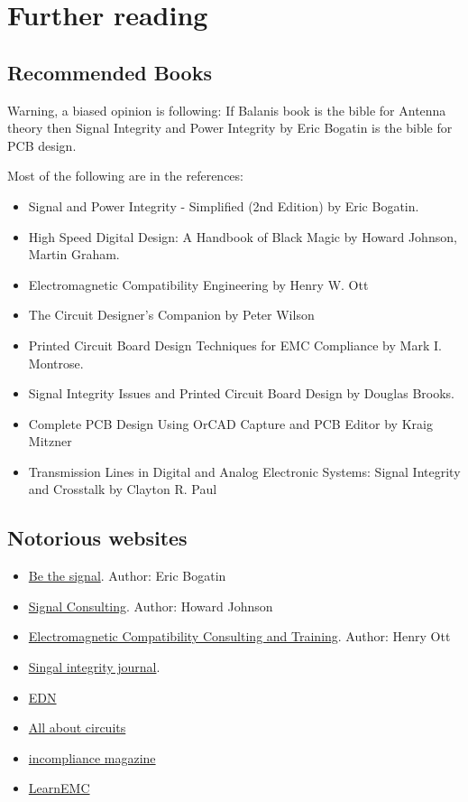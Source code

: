 \documentclass[final]{cubedoc}
\begin{document}
	
	\section{Further reading}
	\subsection{Recommended Books}
	
	Warning, a biased opinion is following: If Balanis book is the bible for Antenna theory then Signal Integrity and Power Integrity by Eric Bogatin is the bible for PCB design.
	
	Most of the following are in the references:
	\begin{itemize}
		\item Signal and Power Integrity - Simplified (2nd Edition) by Eric Bogatin.
		\item High Speed Digital Design: A Handbook of Black Magic by Howard Johnson, Martin Graham.
		\item Electromagnetic Compatibility Engineering by Henry W. Ott
		\item The Circuit Designer's Companion by Peter Wilson
		\item Printed Circuit Board Design Techniques for EMC Compliance by Mark I. Montrose.
		\item Signal Integrity Issues and Printed Circuit Board Design by Douglas Brooks.
		\item Complete PCB Design Using OrCAD Capture and PCB Editor by Kraig Mitzner
		\item Transmission Lines in Digital and Analog Electronic Systems: Signal Integrity and Crosstalk by Clayton R. Paul
	\end{itemize}
	
	\subsection{Notorious websites}
	\begin{itemize}
		\item \href{https://bethesignal.com/bogatin/}{Be the signal}. Author: Eric Bogatin
		\item \href{http://www.sigcon.com/}{Signal Consulting}. Author: Howard Johnson
		\item \href{http://www.hottconsultants.com/}{Electromagnetic Compatibility Consulting and Training}. Author: Henry Ott
		\item \href{https://www.signalintegrityjournal.com/}{Singal integrity journal}. 
		\item \href{https://www.edn.com/}{EDN}
		\item \href{https://www.allaboutcircuits.com/}{Αll about circuits}
		\item \href{https://incompliancemag.com/topics/resources/}{incompliance magazine}
		\item \href{https://learnemc.com/}{LearnEMC}
	\end{itemize}
	
	
	
	
	
	
\end{document}
